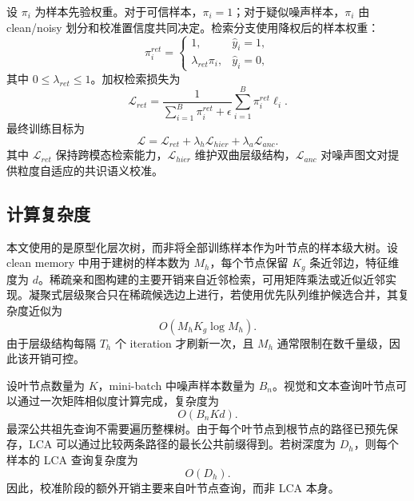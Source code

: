 设 $\pi_i$ 为样本先验权重。对于可信样本，$\pi_i=1$；对于疑似噪声样本，$\pi_i$ 由 clean/noisy 划分和校准置信度共同决定。检索分支使用降权后的样本权重：
\begin{equation}
    \pi_i^{ret}
    =
    \begin{cases}
    1, & \hat{y}_i=1,\\
    \lambda_{ret}\pi_i, & \hat{y}_i=0,
    \end{cases}
\end{equation}
其中 $0\leq\lambda_{ret}\leq1$。加权检索损失为
\begin{equation}
    \mathcal{L}_{ret}
    =
    \frac{1}{\sum_{i=1}^{B}\pi_i^{ret}+\epsilon}
    \sum_{i=1}^{B}
    \pi_i^{ret}\ell_i.
\end{equation}
最终训练目标为
\begin{equation}
    \mathcal{L}
    =
    \mathcal{L}_{ret}
    +
    \lambda_h\mathcal{L}_{hier}
    +
    \lambda_a\mathcal{L}_{anc}.
\end{equation}
其中 $\mathcal{L}_{ret}$ 保持跨模态检索能力，$\mathcal{L}_{hier}$ 维护双曲层级结构，$\mathcal{L}_{anc}$ 对噪声图文对提供粒度自适应的共识语义校准。

\subsection{计算复杂度}

本文使用的是原型化层次树，而非将全部训练样本作为叶节点的样本级大树。设 clean memory 中用于建树的样本数为 $M_h$，每个节点保留 $K_g$ 条近邻边，特征维度为 $d$。稀疏亲和图构建的主要开销来自近邻检索，可用矩阵乘法或近似近邻实现。凝聚式层级聚合只在稀疏候选边上进行，若使用优先队列维护候选合并，其复杂度近似为
\begin{equation}
    O(M_hK_g\log M_h).
\end{equation}
由于层级结构每隔 $T_h$ 个 iteration 才刷新一次，且 $M_h$ 通常限制在数千量级，因此该开销可控。

设叶节点数量为 $K$，mini-batch 中噪声样本数量为 $B_n$。视觉和文本查询叶节点可以通过一次矩阵相似度计算完成，复杂度为
\begin{equation}
    O(B_nKd).
\end{equation}
最深公共祖先查询不需要遍历整棵树。由于每个叶节点到根节点的路径已预先保存，LCA 可以通过比较两条路径的最长公共前缀得到。若树深度为 $D_h$，则每个样本的 LCA 查询复杂度为
\begin{equation}
    O(D_h).
\end{equation}
因此，校准阶段的额外开销主要来自叶节点查询，而非 LCA 本身。

